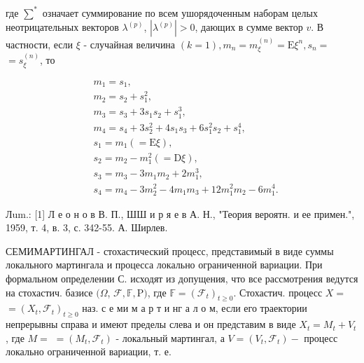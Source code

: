 \documentclass[10pt]{article}
\begin{document}
где $\sum^{*}$ означает суммирование по всем ушорядоченным наборам целых неотрицательных векторов $\lambda^{(p)}$, $\left|\lambda^{(p)}\right|>0$, дающих в сумме вектор $v$. В частности, если $\xi$ - случайная величина $(k=1), m_{n}=m_{\xi}^{(n)}=\mathrm{E} \xi^{n}, s_{n}=$ $=s_{\xi}^{(n)}$, то



\[

\begin{aligned}

& m_{1}=s_{1}, \\

& m_{2}=s_{2}+s_{1}^{2}, \\

& m_{3}=s_{3}+3 s_{1} s_{2}+s_{1}^{3}, \\

& m_{4}=s_{4}+3 s_{2}^{2}+4 s_{1} s_{3}+6 s_{1}^{2} s_{2}+s_{1}^{4}, \\

& s_{1}=m_{1}(=\mathrm{E} \xi), \\

& s_{2}=m_{2}-m_{1}^{2}(=\mathrm{D} \xi), \\

& s_{3}=m_{3}-3 m_{1} m_{2}+2 m_{1}^{3}, \\

& s_{4}=m_{4}-3 m_{2}^{2}-4 m_{1} m_{3}+12 m_{1}^{2} m_{2}-6 m_{1}^{4} .

\end{aligned}

\]



Лum.: [1] Л е о н о в В. П., ШШ и р я е в А. Н., "Теория вероятн. и ее примен.", 1959, т. 4, в. 3, с. 342-55. А. Ширлев.



СЕМИМАРТИНГАЛ - стохастический процесс, представимый в виде суммы локального мартингала и процесса локально ограниченной вариации. При формальном определении С. исходят из допущения, что все рассмотрения ведутся на стохастич. базисе $(\Omega$, $\mathscr{F}, \mathbb{F}, \mathrm{P})$, где $\mathbb{F}=\left(\mathscr{F}_{t}\right)_{t \geqslant 0}$. Стохастич. процесс $X=$ $=\left(X_{t}, \mathscr{F}_{t}\right)_{t \geqslant 0}$ наз. с е ми м а р т и нг а л о м, если его траектории непрерывны справа и имеют пределы слева и он представим в виде $X_{t}=M_{t}+V_{t}$, где $M=$ $=\left(M_{t}, \mathscr{F}_{t}\right)$ - локальный мартингал, а $V=\left(V_{t}, \mathscr{F}_{t}\right)-$ процесс локально ограниченной вариации, т. е.
\end{document}
